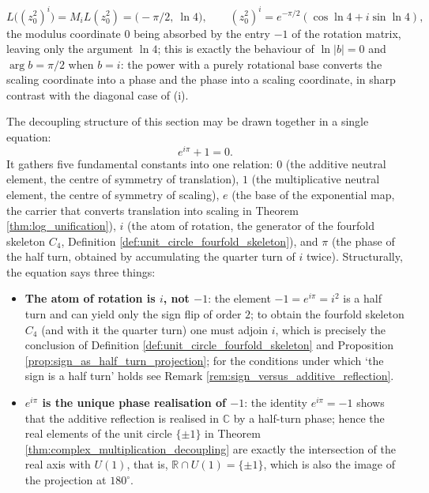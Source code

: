 \begin{example}
\begin{enumerate}[label=(\roman*)]
    \[
    L\bigl((z_0^2)^i\bigr)=M_iL(z_0^2)=\bigl(-\pi/2,\ \ln 4\bigr),\qquad (z_0^2)^i=e^{-\pi/2}(\cos\ln 4+i\sin\ln 4),
    \]
    the modulus coordinate $0$ being absorbed by the entry $-1$ of the rotation matrix, leaving only the argument $\ln 4$; this is exactly the behaviour of $\ln|b|=0$ and $\arg b=\pi/2$ when $b=i$: the power with a purely rotational base converts the scaling coordinate into a phase and the phase into a scaling coordinate, in sharp contrast with the diagonal case of (i).
\end{enumerate}
\end{example}

\begin{remark}[$e^{i\pi}+1=0$: the meeting of five fundamental constants]\label{rem:euler_identity_closing}
The decoupling structure of this section may be drawn together in a single equation:
\[
e^{i\pi}+1=0.
\]
It gathers five fundamental constants into one relation: $0$ (the additive neutral element, the centre of symmetry of translation), $1$ (the multiplicative neutral element, the centre of symmetry of scaling), $e$ (the base of the exponential map, the carrier that converts translation into scaling in Theorem \ref{thm:log_unification}), $i$ (the atom of rotation, the generator of the fourfold skeleton $C_4$, Definition \ref{def:unit_circle_fourfold_skeleton}), and $\pi$ (the phase of the half turn, obtained by accumulating the quarter turn of $i$ twice). Structurally, the equation says three things:
\begin{itemize}
    \item \textbf{The atom of rotation is $i$, not $-1$}: the element $-1=e^{i\pi}=i^2$ is a half turn and can yield only the sign flip of order $2$; to obtain the fourfold skeleton $C_4$ (and with it the quarter turn) one must adjoin $i$, which is precisely the conclusion of Definition \ref{def:unit_circle_fourfold_skeleton} and Proposition \ref{prop:sign_as_half_turn_projection}; for the conditions under which `the sign is a half turn' holds see Remark \ref{rem:sign_versus_additive_reflection}.
    \item \textbf{$e^{i\pi}$ is the unique phase realisation of $-1$}: the identity $e^{i\pi}=-1$ shows that the additive reflection is realised in $\mathbb{C}$ by a half-turn phase; hence the real elements of the unit circle $\{\pm1\}$ in Theorem \ref{thm:complex_multiplication_decoupling} are exactly the intersection of the real axis with $U(1)$, that is, $\mathbb{R}\cap U(1)=\{\pm1\}$, which is also the image of the projection at $180^\circ$.

\end{itemize}
\end{remark}
